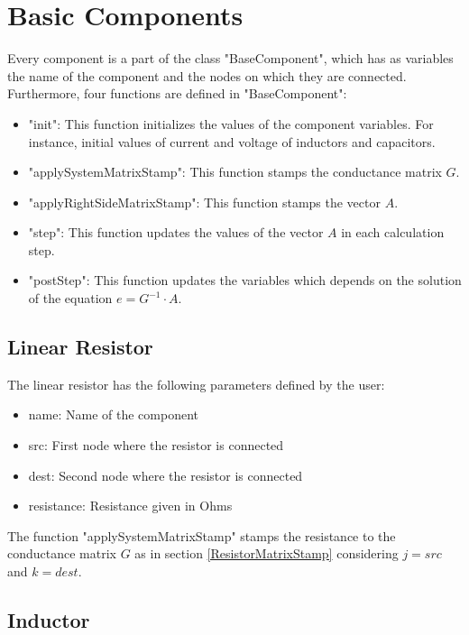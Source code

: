 \section{Basic Components}

Every component is a part of the class "BaseComponent", which has as variables the name of the component and the nodes on which they are connected. Furthermore, four functions are defined in "BaseComponent":

\begin{itemize}
\item "init": This function initializes the values of the component variables. For  instance, initial values of current and voltage of inductors and capacitors.

\item "applySystemMatrixStamp": This function stamps the conductance matrix $G$.

\item "applyRightSideMatrixStamp": This function stamps the vector $A$.

\item "step": This function updates the values of the vector $A$ in each calculation step.

\item "postStep": This function updates the variables which depends on the solution of the equation $e=G^{-1} \cdot A$.
\end{itemize}

\subsection{Linear Resistor}
The linear resistor has the following parameters defined by the user:
\begin{itemize}
\item name: Name of the component
\item src: First node where the resistor is connected
\item dest: Second node where the resistor is connected
\item resistance: Resistance given in Ohms
\end{itemize}

The function "applySystemMatrixStamp" stamps the resistance to the conductance matrix $G$ as in section \ref{ResistorMatrixStamp} considering $j=src$ and $k=dest$.


\subsection{Inductor}

